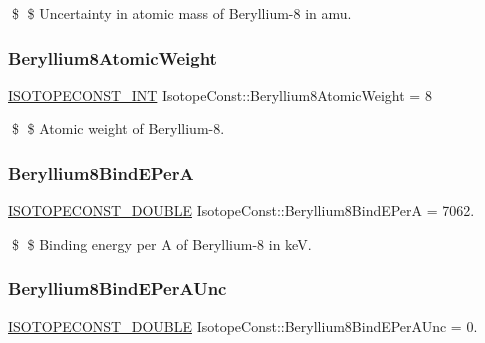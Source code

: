 \$ \$ Uncertainty in atomic mass of Beryllium-\/8 in amu. \mbox{\label{group___isotope_const-_beryllium-_be8_ga1052bf80b7c327e5efa0c2b952da37c9}} 
\subsubsection{\texorpdfstring{Beryllium8\+Atomic\+Weight}{Beryllium8AtomicWeight}}
{\footnotesize\ttfamily \mbox{\hyperlink{group___isotope_const-_macros_ga5f18360b3e99483a35c32d789e62621c}{I\+S\+O\+T\+O\+P\+E\+C\+O\+N\+S\+T\+\_\+\+I\+NT}} Isotope\+Const\+::\+Beryllium8\+Atomic\+Weight = 8}

\$ \$ Atomic weight of Beryllium-\/8. \mbox{\label{group___isotope_const-_beryllium-_be8_ga1ced61c909889e95afa0b619c997ffba}} 
\subsubsection{\texorpdfstring{Beryllium8\+Bind\+E\+PerA}{Beryllium8BindEPerA}}
{\footnotesize\ttfamily \mbox{\hyperlink{group___isotope_const-_macros_ga8f45a7272ce02c0b4c65c44636ed719a}{I\+S\+O\+T\+O\+P\+E\+C\+O\+N\+S\+T\+\_\+\+D\+O\+U\+B\+LE}} Isotope\+Const\+::\+Beryllium8\+Bind\+E\+PerA = 7062.}

\$ \$ Binding energy per A of Beryllium-\/8 in keV. \mbox{\label{group___isotope_const-_beryllium-_be8_ga4dc14f3aaf665965220f8617c89b6664}} 
\subsubsection{\texorpdfstring{Beryllium8\+Bind\+E\+Per\+A\+Unc}{Beryllium8BindEPerAUnc}}
{\footnotesize\ttfamily \mbox{\hyperlink{group___isotope_const-_macros_ga8f45a7272ce02c0b4c65c44636ed719a}{I\+S\+O\+T\+O\+P\+E\+C\+O\+N\+S\+T\+\_\+\+D\+O\+U\+B\+LE}} Isotope\+Const\+::\+Beryllium8\+Bind\+E\+Per\+A\+Unc = 0.}

